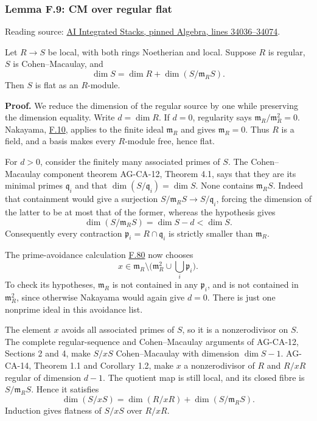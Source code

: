 \documentclass[11pt,a4paper,openany]{report}
\begin{document}
\label{AG-RG-S05-algebra-lemma-CM-over-regular-flat}

\subsubsection{Lemma F.9: CM over regular flat}\label{AG-RG-S05-lemma-f.9-cm-over-regular-flat}

Reading source: \href{https://github.com/KokunoYumeto/unofficial-stacks-project-ai-drafts/blob/565b10e987aba5969b21145a0833f42d69f96790/algebra.tex\#L34036-L34074}{AI Integrated Stacks, pinned Algebra, lines 34036--34074}.

Let \(R\to S\) be local, with both rings Noetherian and local. Suppose \(R\) is regular, \(S\) is Cohen--Macaulay, and \[\dim S=\dim R+\dim(S/\mathfrak m_RS).\] Then \(S\) is flat as an \(R\)-module.

\textbf{Proof.} We reduce the dimension of the regular source by one while preserving the dimension equality. Write \(d=\dim R\). If \(d=0\), regularity says \(\mathfrak m_R/\mathfrak m_R^2=0\). Nakayama, \hyperref[AG-RG-S05-algebra-lemma-NAK]{F.10}, applies to the finite ideal \(\mathfrak m_R\) and gives \(\mathfrak m_R=0\). Thus \(R\) is a field, and a basis makes every \(R\)-module free, hence flat.

For \(d>0\), consider the finitely many associated primes of \(S\). The Cohen--Macaulay component theorem AG-CA-12, Theorem 4.1, says that they are its minimal primes \(\mathfrak q_i\) and that \(\dim(S/\mathfrak q_i)=\dim S\). None contains \(\mathfrak m_RS\). Indeed that containment would give a surjection \(S/\mathfrak m_RS\to S/\mathfrak q_i\), forcing the dimension of the latter to be at most that of the former, whereas the hypothesis gives \[\dim(S/\mathfrak m_RS)=\dim S-d<\dim S.\] Consequently every contraction \(\mathfrak p_i=R\cap\mathfrak q_i\) is strictly smaller than \(\mathfrak m_R\).

The prime-avoidance calculation \hyperref[AG-RG-S05-algebra-lemma-silly]{F.80} now chooses \[x\in\mathfrak m_R\setminus\bigl(\mathfrak m_R^2\cup\textstyle\bigcup_i\mathfrak p_i\bigr).\] To check its hypotheses, \(\mathfrak m_R\) is not contained in any \(\mathfrak p_i\), and is not contained in \(\mathfrak m_R^2\), since otherwise Nakayama would again give \(d=0\). There is just one nonprime ideal in this avoidance list.

The element \(x\) avoids all associated primes of \(S\), so it is a nonzerodivisor on \(S\). The complete regular-sequence and Cohen--Macaulay arguments of AG-CA-12, Sections 2 and 4, make \(S/xS\) Cohen--Macaulay with dimension \(\dim S-1\). AG-CA-14, Theorem 1.1 and Corollary 1.2, make \(x\) a nonzerodivisor of \(R\) and \(R/xR\) regular of dimension \(d-1\). The quotient map is still local, and its closed fibre is \(S/\mathfrak m_RS\). Hence it satisfies \[\dim(S/xS)=\dim(R/xR)+\dim(S/\mathfrak m_RS).\] Induction gives flatness of \(S/xS\) over \(R/xR\).
\end{document}
